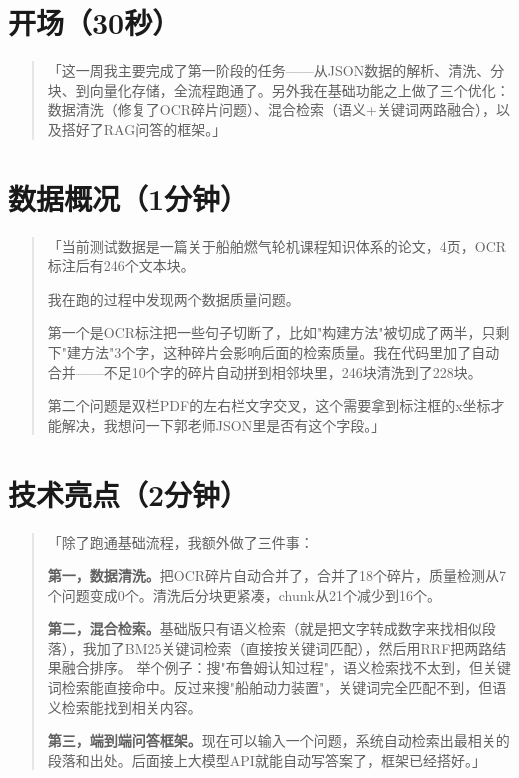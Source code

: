 \documentclass[12pt,a4paper,landscape]{article}
\begin{document}
\section{开场（30秒）}

\begin{quote}
\kaishu
「这一周我主要完成了第一阶段的任务——从JSON数据的解析、清洗、分块、到向量化存储，全流程跑通了。另外我在基础功能之上做了三个优化：数据清洗（修复了OCR碎片问题）、混合检索（语义+关键词两路融合），以及搭好了RAG问答的框架。」
\end{quote}

\section{数据概况（1分钟）}

\begin{quote}
\kaishu
「当前测试数据是一篇关于船舶燃气轮机课程知识体系的论文，4页，OCR标注后有246个文本块。

我在跑的过程中发现两个数据质量问题。

第一个是OCR标注把一些句子切断了，比如"构建方法"被切成了两半，只剩下"建方法"3个字，这种碎片会影响后面的检索质量。我在代码里加了自动合并——不足10个字的碎片自动拼到相邻块里，246块清洗到了228块。

第二个问题是双栏PDF的左右栏文字交叉，这个需要拿到标注框的x坐标才能解决，我想问一下郭老师JSON里是否有这个字段。」
\end{quote}

\section{技术亮点（2分钟）}

\begin{quote}
\kaishu
「除了跑通基础流程，我额外做了三件事：

\textbf{第一，数据清洗。}把OCR碎片自动合并了，合并了18个碎片，质量检测从7个问题变成0个。清洗后分块更紧凑，chunk从21个减少到16个。

\textbf{第二，混合检索。}基础版只有语义检索（就是把文字转成数字来找相似段落），我加了BM25关键词检索（直接按关键词匹配），然后用RRF把两路结果融合排序。
举个例子：搜"布鲁姆认知过程"，语义检索找不太到，但关键词检索能直接命中。反过来搜"船舶动力装置"，关键词完全匹配不到，但语义检索能找到相关内容。

\textbf{第三，端到端问答框架。}现在可以输入一个问题，系统自动检索出最相关的段落和出处。后面接上大模型API就能自动写答案了，框架已经搭好。」
\end{quote}
\end{document}
